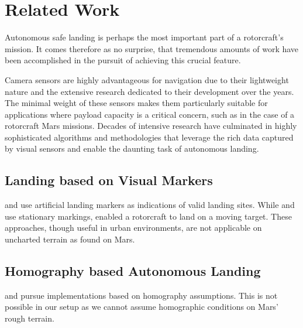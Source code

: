 \chapter{Related Work}
\label{sec:relwork}


Autonomous safe landing is perhaps the most important part of a rotorcraft's mission. It comes therefore as no surprise, that tremendous amounts of work have been accomplished in the pursuit of achieving this crucial feature. 

Camera sensors are highly advantageous for navigation due to their lightweight nature and the extensive research dedicated to their development over the years. The minimal weight of these sensors makes them particularly suitable for applications where payload capacity is a critical concern, such as in the case of a rotorcraft Mars missions. Decades of intensive research have culminated in highly sophisticated algorithms and methodologies that leverage the rich data captured by visual sensors and enable the daunting task of autonomous landing.

\section{Landing based on Visual Markers}
\citep{Saripalli2002VisionBasedLanding,Falanga2017QuadrotorLanding} and \citep{Mu2023VisionBasedLanding} use artificial landing markers as indications of valid landing sites. While \citep{Saripalli2002VisionBasedLanding} and \citep{Mu2023VisionBasedLanding} use stationary markings, \citep{Falanga2017QuadrotorLanding} enabled a rotorcraft to land on a moving target. These approaches,  though useful in urban environments,  are not applicable on uncharted terrain as found on Mars.

\section{Homography based Autonomous Landing}

\citep{Bosch2006AutonomousDetection,Brockers2011AutonomousLanding,Desaraju2015VisionBased} and \citep{Brockers2014TowardsAutonomous} pursue implementations based on homography assumptions. This is not possible in our setup as we cannot assume homographic conditions on Mars' rough terrain. %

